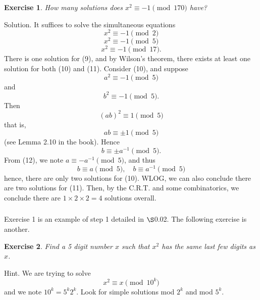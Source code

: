 \documentclass{article}
\newtheorem{exercise}{Exercise}
\begin{document}
\subsubsection{}
\begin{exercise}
    How many solutions does $x^{2} \equiv -1 \pmod{170}$ have?
\end{exercise}
Solution. It suffices to solve the simultaneous equations
\begin{equation}
    x^{2} \equiv -1 \pmod{2}
\end{equation}
\begin{equation}
    x^{2} \equiv -1 \pmod{5}
\end{equation}
\begin{equation}
    x^{2} \equiv -1 \pmod{17}.
\end{equation}
There is one solution for (9), and by Wilson's theorem, there exists at least one solution for both (10) and (11). Consider (10), and suppose
\begin{equation}
    a^{2} \equiv -1 \pmod{5}
\end{equation}
and
\begin{equation}
    b^{2} \equiv -1 \pmod{5}.
\end{equation}
Then
\begin{equation}
    (ab)^{2} \equiv 1 \pmod{5}
\end{equation}
that is,
\begin{equation}
    ab \equiv \pm 1 \pmod{5}
\end{equation}
(see Lemma 2.10 in the book). Hence
\begin{equation}
    b \equiv \pm a^{-1} \pmod{5}.
\end{equation}
From (12), we note $a \equiv - a^{-1} \pmod{5}$, and thus
\begin{equation}
    b \equiv a \pmod{5}, \quad b \equiv a^{-1} \pmod{5}
\end{equation}
hence, there are only two solutions for (10). WLOG, we can also conclude there are two solutions for (11). Then, by the C.R.T. and some combinatorics, we conclude there are $1 \times 2 \times 2 = 4$ solutions overall.

\subsubsection{}
Exercise 1 is an example of step 1 detailed in $\S$0.02. The following exercise is another.
\begin{exercise}
    Find a 5 digit number $x$ such that $x^{2}$ has the same last few digits as $x$. 
\end{exercise}
Hint. We are trying to solve
\begin{equation}
    x^{2} \equiv x \pmod{10^{k}}
\end{equation}
and we note $10^{k} = 5^{k}2^{k}$. Look for simple solutions mod ${2^{k}}$ and mod ${5^{k}}$.
\end{document}
